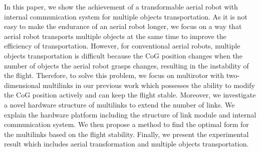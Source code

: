 In this paper, we show the achievement of a transformable aerial robot with internal communication system for multiple objects transportation. As it is not easy to make the endurance of an aerial robot longer, we focus on a way that aerial robot transports multiple objects at the same time to improve the efficiency of transportation. However, for conventional aerial robots, multiple objects transportation is difficult because the CoG position changes when the number of objects the aerial robot grasps changes, resulting in the instability of the flight. Therefore, to solve this problem, we focus on multirotor with two-dimensional multilinks in our previous work which possesses the ability to modify the CoG position actively and can keep the flight stable. Moreover, we investigate a novel hardware structure of multilinks to extend the number of links. We explain the hardware platform including the structure of link module and internal communication system. We then propose a method to find the optimal form for the multilinks based on the flight stability. Finally, we present the experimental result which includes aerial transformation and multiple objects transportation.
